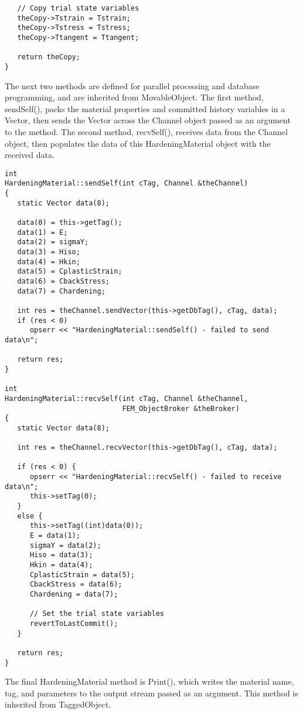 \documentclass[12pt]{article}
\begin{document}
{{\begin{verbatim}
   // Copy trial state variables
   theCopy->Tstrain = Tstrain;
   theCopy->Tstress = Tstress;
   theCopy->Ttangent = Ttangent;
    
   return theCopy;
}
\end{verbatim}
}

\noindent The next two methods are defined for parallel processing and database programming,
and are inherited from MovableObject.
The first method, sendSelf(), packs the material properties and committed history variables
in a Vector, then sends the Vector across the Channel object passed as an argument to the
method. The second method, recvSelf(), receives data from the Channel object, then populates
the data of this HardeningMaterial object with the received data.

{\sf\small
\begin{verbatim}
int 
HardeningMaterial::sendSelf(int cTag, Channel &theChannel)
{
   static Vector data(8);
  
   data(0) = this->getTag();
   data(1) = E;
   data(2) = sigmaY;
   data(3) = Hiso;
   data(4) = Hkin;
   data(5) = CplasticStrain;
   data(6) = CbackStress;
   data(7) = Chardening;
  
   int res = theChannel.sendVector(this->getDbTag(), cTag, data);
   if (res < 0) 
      opserr << "HardeningMaterial::sendSelf() - failed to send data\n";

   return res;
}

int 
HardeningMaterial::recvSelf(int cTag, Channel &theChannel, 
                            FEM_ObjectBroker &theBroker)
{
   static Vector data(8);
   
   int res = theChannel.recvVector(this->getDbTag(), cTag, data);
  
   if (res < 0) {
      opserr << "HardeningMaterial::recvSelf() - failed to receive data\n";
      this->setTag(0);      
   }
   else {
      this->setTag((int)data(0));
      E = data(1);
      sigmaY = data(2);
      Hiso = data(3);
      Hkin = data(4);
      CplasticStrain = data(5);
      CbackStress = data(6);
      Chardening = data(7);

      // Set the trial state variables
      revertToLastCommit();
   }
    
   return res;
}
\end{verbatim}
}

\noindent The final HardeningMaterial method is Print(), which writes the material
name, tag, and parameters to the output stream passed as an argument. This method is
inherited from TaggedObject.

}
\end{document}
